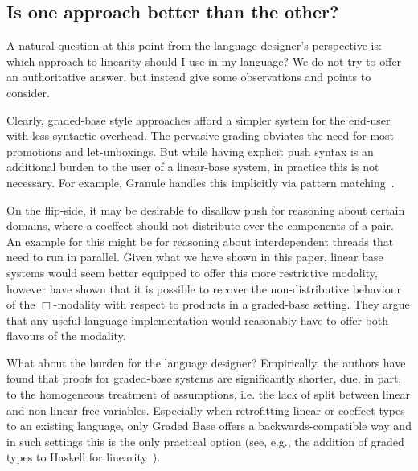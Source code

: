 \subsection{Is one approach better than the other?}
\label{sec:better}
A natural question at this point from the language designer's perspective is: which approach to
linearity should I use in my language? We do not try to offer an authoritative answer, but instead give
some observations and points to consider.

Clearly, graded-base style approaches afford a simpler system for the end-user with less syntactic overhead. The
pervasive grading obviates the need for most promotions and \textsf{let}-unboxings.
But while having explicit \textsf{push} syntax is an additional burden to the user of a
linear-base system, in practice this is not necessary. For example, Granule handles this implicitly
via pattern matching~\cite{DBLP:journals/pacmpl/OrchardLE19, hughes2021linear}.

On the flip-side, it may be desirable to disallow \textsf{push} for reasoning about certain
domains, where a coeffect should not distribute over the components of a pair. An example for this
might be for reasoning about interdependent threads that need to run in parallel. Given what we
have shown in this paper, linear base systems would seem better equipped to offer this more restrictive
modality, however \citet{hughes2021linear} have shown that it is possible to recover the non-distributive behaviour of the $\Box$-modality with respect to products in a graded-base setting.
They argue that any useful language implementation would reasonably have to offer both flavours of
the modality.

What about the burden for the language designer? Empirically, the authors have found that proofs for
graded-base systems are significantly shorter, due, in part, to the homogeneous treatment of
assumptions, i.e. the lack of split between linear and non-linear free variables. Especially
when retrofitting linear or coeffect types to an existing language, only Graded Base offers a
backwards-compatible way and in such settings this is the only practical option (see, e.g.,
the addition of graded types to Haskell for linearity~\cite{DBLP:journals/pacmpl/BernardyBNJS18}).

